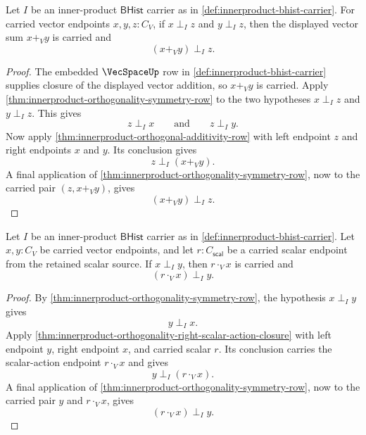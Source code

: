 \begin{theorem}
\label{thm:innerproduct-orthogonality-left-additive-closure}
Let $I$ be an inner-product $\mathsf{BHist}$ carrier as in
\autoref{def:innerproduct-bhist-carrier}. For carried vector endpoints
$x,y,z:C_V$, if $x\perp_I z$ and $y\perp_I z$, then the displayed vector sum
$x+_V y$ is carried and
$$
(x+_V y)\perp_I z.
$$
\end{theorem}
\begin{proof}
The embedded $\VecSpaceUp$ row in
\autoref{def:innerproduct-bhist-carrier} supplies closure of the displayed
vector addition, so $x+_V y$ is carried. Apply
\autoref{thm:innerproduct-orthogonality-symmetry-row} to the two hypotheses
$x\perp_I z$ and $y\perp_I z$. This gives
$$
z\perp_I x
\qquad\text{and}\qquad
z\perp_I y.
$$
Now apply \autoref{thm:innerproduct-orthogonal-additivity-row} with left
endpoint $z$ and right endpoints $x$ and $y$. Its conclusion gives
$$
z\perp_I (x+_V y).
$$
A final application of \autoref{thm:innerproduct-orthogonality-symmetry-row},
now to the carried pair $(z,x+_V y)$, gives
$$
(x+_V y)\perp_I z.
$$
\end{proof}

\begin{theorem}
\label{thm:innerproduct-orthogonality-left-scalar-action-closure}
Let $I$ be an inner-product $\mathsf{BHist}$ carrier as in
\autoref{def:innerproduct-bhist-carrier}. Let $x,y:C_V$ be carried vector
endpoints, and let $r:C_{\mathsf{scal}}$ be a carried scalar endpoint from the
retained scalar source. If $x\perp_I y$, then $r\cdot_V x$ is carried and
$$
(r\cdot_V x)\perp_I y.
$$
\end{theorem}
\begin{proof}
By \autoref{thm:innerproduct-orthogonality-symmetry-row}, the hypothesis
$x\perp_I y$ gives
$$
y\perp_I x.
$$
Apply \autoref{thm:innerproduct-orthogonality-right-scalar-action-closure} with
left endpoint $y$, right endpoint $x$, and carried scalar $r$. Its conclusion
carries the scalar-action endpoint $r\cdot_V x$ and gives
$$
y\perp_I(r\cdot_V x).
$$
A final application of \autoref{thm:innerproduct-orthogonality-symmetry-row},
now to the carried pair $y$ and $r\cdot_V x$, gives
$$
(r\cdot_V x)\perp_I y.
$$
\end{proof}

